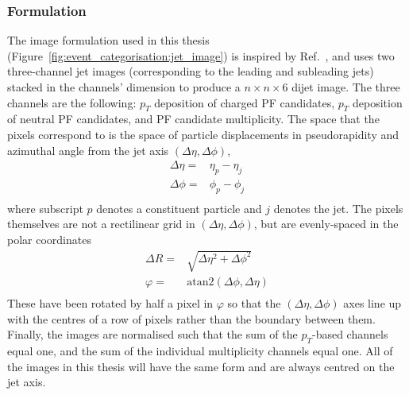 \subsubsection{Formulation}
The image formulation used in this thesis (Figure~\ref{fig:event_categorisation:jet_image}) is inspired by Ref.~\cite{JetsInColour}, and uses two three-channel jet images (corresponding to the leading and subleading jets) stacked in the channels' dimension to produce a $n\times{}n\times{}6$ dijet image.
The three channels are the following: $p_T$ deposition of charged PF candidates, $p_T$ deposition of neutral PF candidates, and PF candidate multiplicity.
The space that the pixels correspond to is the space of particle displacements in pseudorapidity and azimuthal angle from the jet axis $(\Delta\eta,\Delta\phi)$,
\begin{equation}
    \begin{split}
        \Delta\eta =& \eta_{p} - \eta_{j} \\ 
        \Delta\phi =& \phi_{p} - \phi_{j} \\
    \end{split}
    \label{eq:event_categorisation:pixel_coords}
\end{equation}
where subscript $p$ denotes a constituent particle and $j$ denotes the jet. 
The pixels themselves are not a rectilinear grid in $(\Delta\eta,\Delta\phi)$, but are evenly-spaced in the polar coordinates 
\begin{equation}
    \begin{split}
        \Delta{R} =& \sqrt{\Delta\eta^2 + \Delta\phi^2} \\
        \varphi   =& \mathrm{atan2}(\Delta\phi,\Delta\eta) \\
    \end{split}
    \label{eq:event_categorisation:pixel_coords}
\end{equation}
These have been rotated by half a pixel in $\varphi$ so that the $(\Delta\eta,\Delta\phi)$ axes line up with the centres of a row of pixels rather than the boundary between them. 
Finally, the images are normalised such that the sum of the $p_T$-based channels equal one, and the sum of the individual multiplicity channels equal one. 
All of the images in this thesis will have the same form and are always centred on the jet axis.

